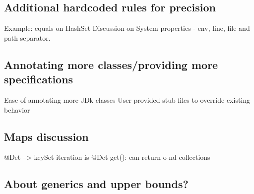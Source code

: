\subsection{Additional hardcoded rules for precision}
Example: equals on HashSet
Discussion on System properties - env, line, file and path separator.

\subsection{Annotating more classes/providing more specifications}
Ease of annotating more JDk classes
User provided stub files to override existing behavior

\subsection{Maps discussion}
@Det --> keySet iteration is @Det
get(): can return o-nd collections

\subsection{About generics and upper bounds?}